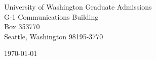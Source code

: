 \begin{minipage}{0.49\textwidth}
\begin{flushleft}
\noindent
University of Washington Graduate Admissions \\
G-1 Communications Building \\
Box 353770 \\
Seattle, Washington 98195-3770
\end{flushleft}
\end{minipage}
\begin{minipage}{0.47\textwidth}
\begin{flushright}
\today
\end{flushright}
\end{minipage} \\

\newcommand{\univ}{University of Washington}
\newcommand{\univshort}{UW}
\newcommand{\degree}{Ph.D.}
\newcommand{\dept}{Computer Science and Engineering}